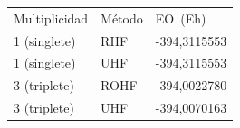 \documentclass[]{article}
\begin{document}
\begin{longtable}[]{@{}lll@{}}
\toprule
\begin{minipage}[t]{0.30\columnwidth}\raggedright\strut
{Multiplicidad}\strut
\end{minipage} & \begin{minipage}[t]{0.30\columnwidth}\raggedright\strut
{Método}\strut
\end{minipage} & \begin{minipage}[t]{0.30\columnwidth}\raggedright\strut
{E}{O}{~(E}{h}{)}\strut
\end{minipage}\tabularnewline
\begin{minipage}[t]{0.30\columnwidth}\raggedright\strut
{1 (singlete)}\strut
\end{minipage} & \begin{minipage}[t]{0.30\columnwidth}\raggedright\strut
{RHF}\strut
\end{minipage} & \begin{minipage}[t]{0.30\columnwidth}\raggedright\strut
{-394,3115553}\strut
\end{minipage}\tabularnewline
\begin{minipage}[t]{0.30\columnwidth}\raggedright\strut
{1 (singlete)}\strut
\end{minipage} & \begin{minipage}[t]{0.30\columnwidth}\raggedright\strut
{UHF}\strut
\end{minipage} & \begin{minipage}[t]{0.30\columnwidth}\raggedright\strut
{-394,3115553}\strut
\end{minipage}\tabularnewline
\begin{minipage}[t]{0.30\columnwidth}\raggedright\strut
{3 (triplete)}\strut
\end{minipage} & \begin{minipage}[t]{0.30\columnwidth}\raggedright\strut
{ROHF}\strut
\end{minipage} & \begin{minipage}[t]{0.30\columnwidth}\raggedright\strut
{-394,0022780}\strut
\end{minipage}\tabularnewline
\begin{minipage}[t]{0.30\columnwidth}\raggedright\strut
{3 (triplete)}\strut
\end{minipage} & \begin{minipage}[t]{0.30\columnwidth}\raggedright\strut
{UHF}\strut
\end{minipage} & \begin{minipage}[t]{0.30\columnwidth}\raggedright\strut
{-394,0070163}\strut
\end{minipage}\tabularnewline
\bottomrule
\end{longtable}
\end{document}
